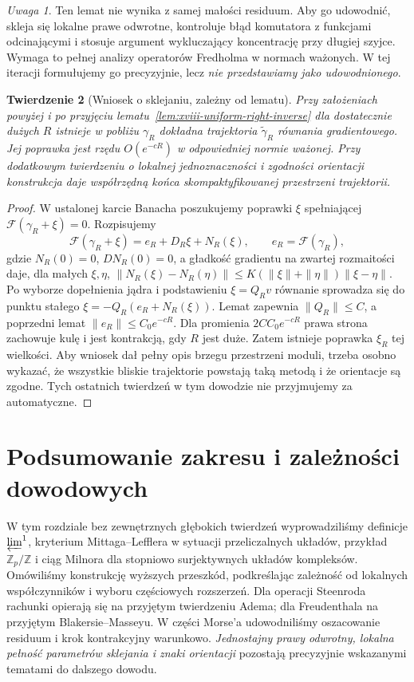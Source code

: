 \documentclass[11pt,a4paper,oneside]{report}
\newcommand{\Z}{\mathbb{Z}}
\theoremstyle{plain}
\newtheorem{twierdzenie}{Twierdzenie}[section]
\theoremstyle{definition}
\theoremstyle{remark}
\newtheorem{uwaga}[twierdzenie]{Uwaga}
\begin{document}
\begin{uwaga}
Ten lemat nie wynika z samej małości residuum.
Aby go udowodnić, skleja się lokalne prawe odwrotne,
kontroluje błąd komutatora z funkcjami odcinającymi i
stosuje argument wykluczający koncentrację przy długiej szyjce.
Wymaga to pełnej analizy operatorów Fredholma w normach
ważonych. W tej iteracji formułujemy go precyzyjnie,
lecz \emph{nie przedstawiamy jako udowodnionego}.
\end{uwaga}
\begin{twierdzenie}[Wniosek o sklejaniu, zależny od lematu]
\label{thm:xviii-gluing-conditional}
Przy założeniach powyżej i po przyjęciu
lematu~\ref{lem:xviii-uniform-right-inverse} dla dostatecznie
dużych $R$ istnieje w pobliżu $\gamma_R$ dokładna
trajektoria $\widetilde\gamma_R$ równania gradientowego.
Jej poprawka jest rzędu $O(e^{-cR})$ w odpowiedniej normie
ważonej. Przy dodatkowym twierdzeniu o lokalnej jednoznaczności
i zgodności orientacji konstrukcja daje współrzędną końca
skompaktyfikowanej przestrzeni trajektorii.
\end{twierdzenie}
\begin{proof}
W ustalonej karcie Banacha poszukujemy poprawki $\xi$
spełniającej $\mathcal F(\gamma_R+\xi)=0$. Rozpisujemy
\[
\mathcal F(\gamma_R+\xi)=e_R+D_R\xi+N_R(\xi),
\qquad e_R=\mathcal F(\gamma_R),
\]
gdzie $N_R(0)=0$, $DN_R(0)=0$, a gładkość gradientu
na zwartej rozmaitości daje, dla małych $\xi,\eta$,
$\|N_R(\xi)-N_R(\eta)\|
\le K(\|\xi\|+\|\eta\|)\|\xi-\eta\|$.
Po wyborze dopełnienia jądra i podstawieniu
$\xi=Q_Rv$ równanie sprowadza się do punktu stałego
$\xi=-Q_R(e_R+N_R(\xi))$.
Lemat zapewnia $\|Q_R\|\le C$, a poprzedni lemat
$\|e_R\|\le C_0e^{-cR}$. Dla promienia
$2CC_0e^{-cR}$ prawa strona zachowuje kulę i jest
kontrakcją, gdy $R$ jest duże. Zatem istnieje poprawka
$\xi_R$ tej wielkości. Aby wniosek dał pełny opis
brzegu przestrzeni moduli, trzeba osobno wykazać, że
wszystkie bliskie trajektorie powstają taką metodą i że
orientacje są zgodne. Tych ostatnich twierdzeń w tym
dowodzie nie przyjmujemy za automatyczne.
\end{proof}

\section{Podsumowanie zakresu i zależności dowodowych}
W tym rozdziale bez zewnętrznych głębokich twierdzeń
wyprowadziliśmy definicje $\varprojlim^1$, kryterium
Mittaga--Lefflera w sytuacji przeliczalnych układów,
przykład $\Z_p/\Z$ i ciąg Milnora dla stopniowo surjektywnych
układów kompleksów. Omówiliśmy konstrukcję
wyższych przeszkód, podkreślając zależność od lokalnych
współczynników i wyboru częściowych rozszerzeń.
Dla operacji Steenroda rachunki opierają się na
przyjętym twierdzeniu Adema; dla Freudenthala na
przyjętym Blakersie--Masseyu.
W części Morse'a udowodniliśmy oszacowanie residuum i
krok kontrakcyjny warunkowo. \emph{Jednostajny prawy odwrotny,
lokalna pełność parametrów sklejania i znaki orientacji}
pozostają precyzyjnie wskazanymi tematami do dalszego dowodu.
\end{document}

